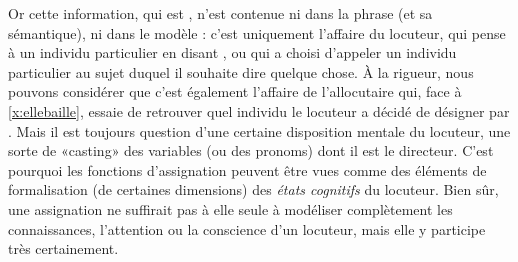 %
Or cette information, qui est ,  n'est contenue ni
dans  la phrase (et sa sémantique), ni dans le modèle : c'est
uniquement l'affaire du locuteur, qui pense à un individu particulier
en disant , ou qui a choisi d'appeler   un
individu particulier au sujet duquel il souhaite dire quelque chose.
À la rigueur, nous pouvons considérer que c'est  également l'affaire de
l'allocutaire qui, face à \ref{x:ellebaille}, essaie de retrouver
quel individu le locuteur a décidé de désigner par .  Mais
il est toujours question d'une certaine disposition mentale du
locuteur, une sorte de «casting» des variables (ou des pronoms)
dont il est le directeur.  C'est pourquoi les fonctions d'assignation
peuvent être vues comme des éléments de formalisation (de certaines
dimensions) des \emph{états cognitifs} du locuteur.  Bien sûr, une
assignation ne suffirait pas à elle seule à modéliser complètement les
connaissances, l'attention ou la conscience d'un locuteur, mais elle
y participe très certainement. 

